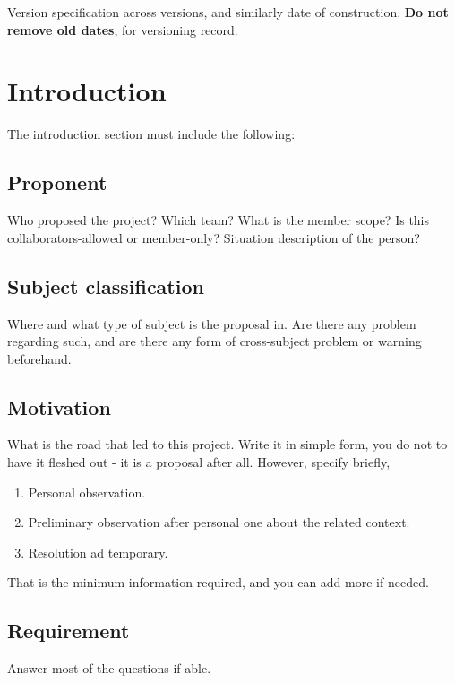 \documentclass[10pt,a4paper]{article}
\begin{document}
Version specification across versions, and similarly date of construction. \textbf{Do not remove old dates}, for versioning record. 

\section{Introduction}
\label{sec:intro}

The introduction section must include the following:

\subsection{Proponent}

Who proposed the project? Which team? What is the member scope? Is this collaborators-allowed or member-only? Situation description of the person?

\subsection{Subject classification}

Where and what type of subject is the proposal in. Are there any problem regarding such, and are there any form of cross-subject problem or warning beforehand. 

\subsection{Motivation}

What is the road that led to this project. Write it in simple form, you do not to have it fleshed out - it is a proposal after all. However, specify briefly,

\begin{enumerate}
    \item Personal observation. 
    \item Preliminary observation after personal one about the related context. 
    \item Resolution ad temporary. 
\end{enumerate}

That is the minimum information required, and you can add more if needed. 

\subsection{Requirement}

Answer most of the questions if able. 
\end{document}
